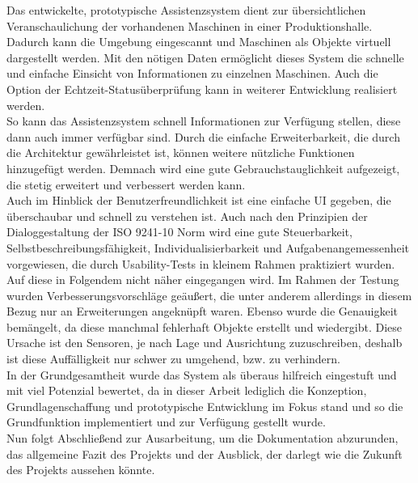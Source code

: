 Das entwickelte, prototypische Assistenzsystem dient zur übersichtlichen Veranschaulichung der vorhandenen Maschinen in einer Produktionshalle. Dadurch kann die 
Umgebung eingescannt und Maschinen als Objekte virtuell dargestellt werden. Mit den nötigen Daten ermöglicht dieses System die schnelle und einfache 
Einsicht von Informationen zu einzelnen Maschinen. Auch die Option der Echtzeit-Statusüberprüfung kann in weiterer Entwicklung realisiert werden. 
\\ 
So kann das Assistenzsystem schnell Informationen zur Verfügung stellen, diese dann auch immer verfügbar sind. Durch die einfache Erweiterbarkeit, die 
durch die Architektur gewährleistet ist, können weitere nützliche Funktionen hinzugefügt werden. Demnach wird eine gute Gebrauchstauglichkeit aufgezeigt, die 
stetig erweitert und verbessert werden kann.
\\ 
Auch im Hinblick der Benutzerfreundlichkeit ist eine einfache \acs{UI} gegeben, die überschaubar und schnell zu verstehen ist. Auch nach den Prinzipien der 
Dialoggestaltung der ISO 9241-10 Norm wird eine gute Steuerbarkeit, Selbstbeschreibungsfähigkeit, Individualisierbarkeit und Aufgabenangemessenheit vorgewiesen, 
die durch Usability-Tests in kleinem Rahmen praktiziert wurden. Auf diese in Folgendem nicht näher eingegangen wird. Im Rahmen der Testung wurden 
Verbesserungsvorschläge geäußert, die unter anderem allerdings in diesem Bezug nur an Erweiterungen angeknüpft waren. Ebenso wurde die Genauigkeit bemängelt, da 
diese manchmal fehlerhaft Objekte erstellt und wiedergibt. Diese Ursache ist den Sensoren, je nach Lage und Ausrichtung zuzuschreiben, deshalb ist diese 
Auffälligkeit nur schwer zu umgehend, bzw. zu verhindern. 
\\ 
In der Grundgesamtheit wurde das System als überaus hilfreich eingestuft und mit viel Potenzial bewertet, da in dieser Arbeit lediglich die Konzeption, 
Grundlagenschaffung und prototypische Entwicklung im Fokus stand und so die Grundfunktion implementiert und zur Verfügung gestellt wurde.
\\ 
\linebreak
Nun folgt Abschließend zur Ausarbeitung, um die Dokumentation abzurunden, das allgemeine Fazit des Projekts und der Ausblick, der darlegt wie die Zukunft des 
Projekts aussehen könnte. 

